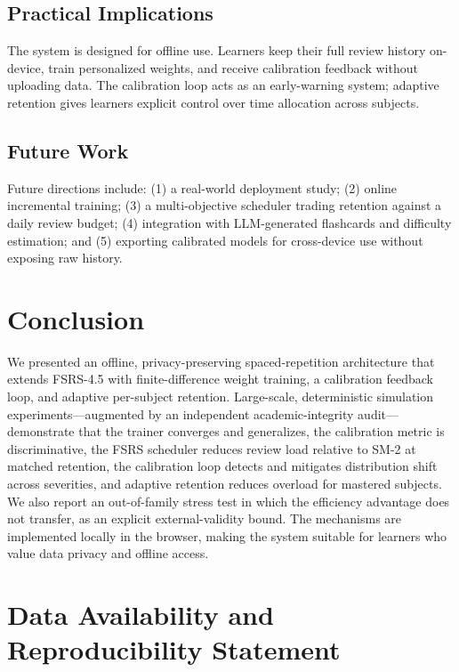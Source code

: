 \documentclass[conference]{IEEEtran}
\begin{document}
\subsection{Practical Implications}

The system is designed for offline use. Learners keep their full review history on-device, train personalized weights, and receive calibration feedback without uploading data. The calibration loop acts as an early-warning system; adaptive retention gives learners explicit control over time allocation across subjects.

\subsection{Future Work}

Future directions include: (1) a real-world deployment study; (2) online incremental training; (3) a multi-objective scheduler trading retention against a daily review budget; (4) integration with LLM-generated flashcards and difficulty estimation; and (5) exporting calibrated models for cross-device use without exposing raw history.

\section{Conclusion}\label{sec:conclusion}

We presented an offline, privacy-preserving spaced-repetition architecture that extends FSRS-4.5 with finite-difference weight training, a calibration feedback loop, and adaptive per-subject retention. Large-scale, deterministic simulation experiments---augmented by an independent academic-integrity audit---demonstrate that the trainer converges and generalizes, the calibration metric is discriminative, the FSRS scheduler reduces review load relative to SM-2 at matched retention, the calibration loop detects and mitigates distribution shift across severities, and adaptive retention reduces overload for mastered subjects. We also report an out-of-family stress test in which the efficiency advantage does not transfer, as an explicit external-validity bound. The mechanisms are implemented locally in the browser, making the system suitable for learners who value data privacy and offline access.

\section*{Data Availability and Reproducibility Statement}
\end{document}
